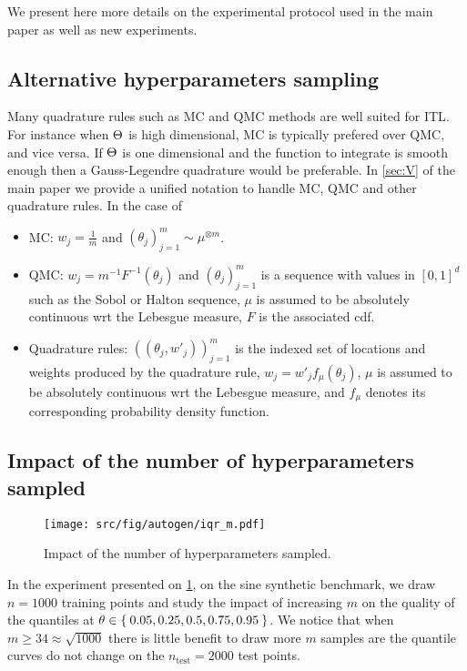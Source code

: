 We present here more details on the experimental protocol used in the main
paper as well as new experiments.
\subsection{Alternative hyperparameters sampling}\label{subsection:sampling}
Many quadrature rules such as \ac{MC} and \ac{QMC} methods are well suited for
\acl{ITL}. For instance when $\Theta$ is high dimensional,
\ac{MC} is typically prefered over \ac{QMC}, and vice versa. If
$\Theta$ is one dimensional and the function to integrate is
smooth enough then a Gauss-Legendre quadrature would be preferable. In
\cref{sec:V} of the main paper we provide a unified notation to handle
\ac{MC}, \ac{QMC} and other quadrature rules. In the case of
\begin{itemize}
    \item \ac{MC}: $w_j = \frac{1}{m}$ and $(\theta_j)_{j=1}^m
    \sim \mu^{\otimes m}$.
    \item \ac{QMC}: $w_j = m^{-1}F^{-1}(\theta_j)$ and $(\theta_j)_{j=1}^m$
    is a sequence with values in $[0, 1]^d$ such as the %
    Sobol or Halton sequence, $\mu$ is assumed to be absolutely continuous
    \acs{wrt} the Lebesgue measure, $F$ is the associated cdf.
    \item Quadrature rules: $((\theta_j, w'_j))_{j=1}^m$ is the indexed set of
    locations and weights produced by the quadrature rule, $w_j
    = w'_j f_{\mu}(\theta_j)$, $\mu$ is assumed to be absolutely continuous
    \acs{wrt} the Lebesgue measure, and $f_\mu$ denotes its corresponding
    probability density function.
\end{itemize}
\subsection{Impact of the number of hyperparameters sampled}
\begin{figure}[!htbp]
    \centering
    \texttt{[image: src/fig/autogen/iqr\_m.pdf]}
    \caption{Impact of the number of hyperparameters sampled.
             \label{figure:iqr_m}}
\end{figure}
In the experiment presented on \cref{figure:iqr_m}, on the sine synthetic
benchmark, we draw $n=1000$ training points and study the impact of increasing
$m$ on the quality of the quantiles at $\theta\in\Set{0.05, 0.25, 0.5, 0.75,
0.95}$. We notice that when $m\ge34\approx\sqrt{1000}$ there is little benefit
to draw more $m$ samples are the quantile curves do not change on the
$n_{\text{test}}=2000$ test points.
